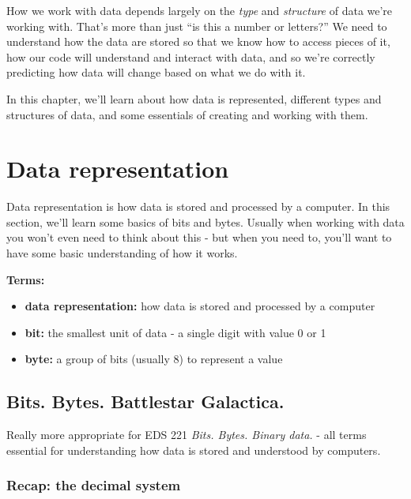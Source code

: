 \documentclass[
]{book}
\begin{document}
How we work with data depends largely on the \emph{type} and \emph{structure} of data we're working with. That's more than just ``is this a number or letters?'' We need to understand how the data are stored so that we know how to access pieces of it, how our code will understand and interact with data, and so we're correctly predicting how data will change based on what we do with it.

In this chapter, we'll learn about how data is represented, different types and structures of data, and some essentials of creating and working with them.

\hypertarget{data-representation}{%
\section{Data representation}\label{data-representation}}

Data representation is how data is stored and processed by a computer. In this section, we'll learn some basics of bits and bytes. Usually when working with data you won't even need to think about this - but when you need to, you'll want to have some basic understanding of how it works.

\textbf{Terms:}

\begin{itemize}
\item
  \textbf{data representation:} how data is stored and processed by a computer
\item
  \textbf{bit:} the smallest unit of data - a single digit with value 0 or 1
\item
  \textbf{byte:} a group of bits (usually 8) to represent a value
\end{itemize}

\hypertarget{bits.-bytes.-battlestar-galactica.}{%
\subsection{Bits. Bytes. Battlestar Galactica.}\label{bits.-bytes.-battlestar-galactica.}}

Really more appropriate for EDS 221 \emph{Bits. Bytes. Binary data.} - all terms essential for understanding how data is stored and understood by computers.

\hypertarget{recap-the-decimal-system}{%
\subsubsection{Recap: the decimal system}\label{recap-the-decimal-system}}
\end{document}
